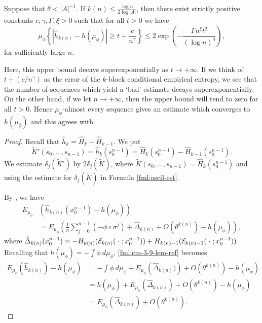 \begin{theorem} \label{thm:cm-4-2}
	Suppose that $\theta < |A|^{-1}$. If $k(n) \leq \frac{\log{n}}{2\log{|A|}}$, then there exist strictly positive constants $c, \gamma, \Gamma, \xi > 0$ such that for all $t > 0$ we have
	\begin{equation}
		\mu_\phi\left\{\left|\hat{h}_{k(n)} - h(\mu_\phi)\right| \geq t + \frac{c}{n^\gamma}\right\} \leq 2\exp\left(-\frac{\Gamma n^\xi t^2}{(\log{n})^4}\right),
	\end{equation}
	for sufficiently large $n$.
	
	Here, this upper bound decays superexponentially as $t \to +\infty$. If we think of $t + (c / n^\gamma)$ as the error of the $k$-block conditional empirical entropy, we see that the number of sequences which yield a `bad' estimate decays superexponentially. On the other hand, if we let $n \to +\infty$, then the upper bound will tend to zero for all $t > 0$. Hence $\mu_\phi$-almost every sequence gives an estimate which converges to $h(\mu_\phi)$ and this agrees with 
	
	\begin{proof}
		Recall that $\hat{h}_k = \hat{H}_k - \hat{H}_{k - 1}$. We put
		\[
			\tilde{K}'(s_0, \dots, s_{n - 1}) = \hat{h}_k(s_0^{n - 1}) = \hat{H}_k(s_0^{n - 1}) - \hat{H}_{k - 1}(s_0^{n - 1}).
		\]
		We estimate $\delta_j(\tilde{K}')$ by $2\delta_j(\tilde{K})$, where $\tilde{K}(s_0, \dots, s_{n - 1}) = \hat{H}_k(s_0^{n - 1})$ and using the estimate for $\delta_j(\tilde{K})$ in Formula \eqref{fml:oscil-est}.
		
		By , we have
		\begin{align}
			E_{\mu_\phi}&\left(\hat{h}_{k(n)}(x_0^{n - 1}) - h(\mu_\phi)\right) \nonumber \\
				&= E_{\mu_\phi}\left(\frac{1}{n}\sum_{j = 0}^{n - 1}(-\phi \circ \sigma^j) + \hat{\Delta}_{k(n)} + O(\theta^{k(n)}) - h(\mu_\phi)\right), \label{fml:cm-3-9-lem-ref}
		\end{align}
		where $\hat{\Delta}_{k(n)}(x_0^{n - 1}) = -H_{k(n)}(\mathcal{E}_{k(n)}(\mathrel{}\cdot\mathrel{}; x_0^{n - 1})) + H_{k(n) - 1}(\mathcal{E}_{k(n) - 1}(\mathrel{}\cdot\mathrel{}; x_0^{n - 1}))$. 
		Recalling that $h(\mu_\phi) = -\int{\phi\ d\mu_\phi}$, \eqref{fml:cm-3-9-lem-ref} becomes
		\begin{align*}
			E_{\mu_\phi}\left(\hat{h}_{k(n)}\right) - h(\mu_\phi) &= -\int{\phi\ d\mu_\phi} + E_{\mu_\phi}\left(\hat{\Delta}_{k(n)})\right) + O(\theta^{k(n)}) - h(\mu_\phi) \\
				&= h(\mu_\phi) + E_{\mu_\phi}\left(\hat{\Delta}_{k(n)}\right) + O(\theta^{k(n)}) - h(\mu_\phi) \\
				&= E_{\mu_\phi}\left(\hat{\Delta}_{k(n)}\right) + O(\theta^{k(n)}).
		\end{align*}
		

\end{proof}
\end{theorem}
